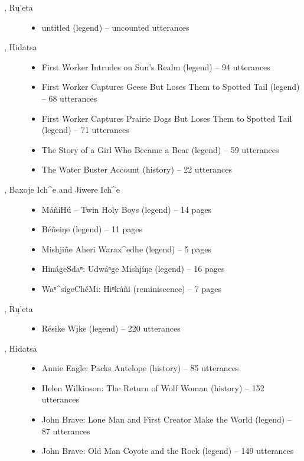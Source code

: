 \documentclass[output=paper]{LSP/langsci}
\begin{document}
\begin{description}
\item[\citet{Kennard1936}, Rų’eta]\hfill
\begin{itemize}
\item untitled (legend) -- uncounted utterances
\end{itemize}

\item[\citet{Lowie1939}, Hidatsa]\hfill
\begin{itemize}
\item First Worker Intrudes on Sun’s Realm (legend) -- 94 utterances
\item First Worker Captures Geese But Loses Them to Spotted Tail (legend) -- 68 utterances
\item First Worker Captures Prairie Dogs But Loses Them to Spotted Tail (legend) -- 71 utterances
\item The Story of a Girl Who Became a Bear (legend) -- 59 utterances
\item The Water Buster Account (history) -- 22 utterances
\end{itemize}

\item[\citet{Marsh1936}, Baxoje Ich\^{}e and Jiwere Ich\^{}e]\hfill
\begin{itemize}
\item MáñiHú -- Twin Holy Boys (legend) -- 14 pages
\item Béñeiŋe (legend) -- 11 pages
\item Mishjiñe Aheri Warax\^{}edhe (legend) -- 5 pages
\item HinágeSdaⁿ: Udwáⁿge Mishjíŋe (legend) -- 16 pages
\item Waⁿ\^{}sígeChéMi: Hiⁿkúñi (reminiscence) -- 7 pages
\end{itemize}

\item[\citet{Mixco1997b}, Rų’eta]\hfill
\begin{itemize}
\item Résike Wįke (legend) -- 220 utterances
\end{itemize}

\item[\citet{ParksJonesHollow1978}, Hidatsa]\hfill
\begin{itemize}
\item Annie Eagle: Packs Antelope (history) -- 85 utterances
\item Helen Wilkinson: The Return of Wolf Woman (history) -- 152 utterances
\item John Brave: Lone Man and First Creator Make the World (legend) -- 87 utterances
\item John Brave: Old Man Coyote and the Rock (legend) -- 149 utterances
\end{itemize}


\end{description}
\end{document}

